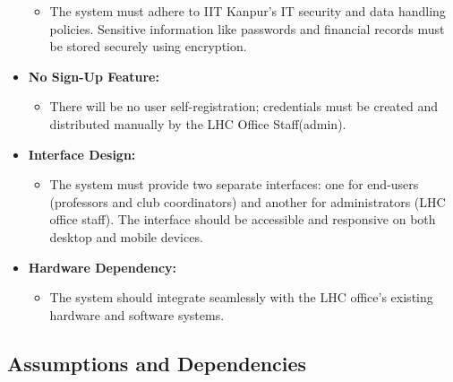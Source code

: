 \documentclass[a4paper,12pt]{article}
\begin{document}
\begin{itemize}
\begin{itemize}
        \item The system must adhere to IIT Kanpur’s IT security and data handling policies. Sensitive information like passwords and financial records must be stored securely using encryption.
    \end{itemize}
    \item \textbf{No Sign-Up Feature:}
    \begin{itemize}
        \item There will be no user self-registration; credentials must be created and distributed manually by the LHC Office Staff(admin).
    \end{itemize}
    \item \textbf{Interface Design:}
    \begin{itemize}
        \item The system must provide two separate interfaces: one for end-users (professors and club coordinators) and another for administrators (LHC office staff).
The interface should be accessible and responsive on both desktop and mobile devices.
    \end{itemize}
    \item \textbf{Hardware Dependency:}
    \begin{itemize}
        \item The system should integrate seamlessly with the LHC office's existing hardware and software systems.
    \end{itemize}
\end{itemize}

\newpage

\subsection{Assumptions and Dependencies} \\\label{subsec:assump_and_dependencies}
\end{document}
